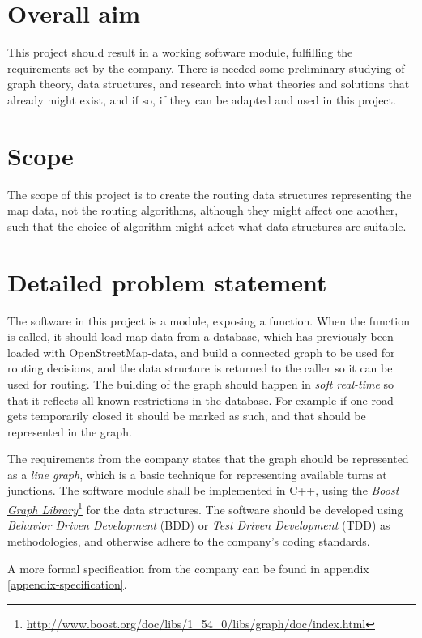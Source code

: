 \documentclass[../main.tex]{subfiles}
\begin{document}
\section{Overall aim}
This project should result in a working software module, fulfilling the requirements set by the company. There is needed some preliminary studying of graph theory, data structures, and research into what theories and solutions that already might exist, and if so, if they can be adapted and used in this project.

\section{Scope}
The scope of this project is to create the routing data structures representing the map data, not the routing algorithms, although they might affect one another, such that the choice of algorithm might affect what data structures are suitable.

\section{Detailed problem statement}\label{sect:detailed-problem}
The software in this project is a module, exposing a function. When the function is called, it should load map data from a database, which has previously been loaded with OpenStreetMap-data, and build a connected graph to be used for routing decisions, and the data structure is returned to the caller so it can be used for routing. The building of the graph should happen in \emph{soft real-time} so that it reflects all known restrictions in the database. For example if one road gets temporarily closed it should be marked as such, and that should be represented in the graph.

The requirements from the company states that the graph should be represented as a \emph{line graph}, which is a basic technique for representing available turns at junctions. The software module shall be implemented in C++, using the \href{http://www.boost.org/doc/libs/1_54_0/libs/graph/doc/index.html}{\emph{Boost Graph Library}}\footnote{\url{http://www.boost.org/doc/libs/1_54_0/libs/graph/doc/index.html}} for the data structures. The software should be developed using \emph{Behavior Driven Development} (BDD) or \emph{Test Driven Development} (TDD) as methodologies, and otherwise adhere to the company's coding standards.

A more formal specification from the company can be found in appendix \ref{appendix-specification}.
\end{document}

